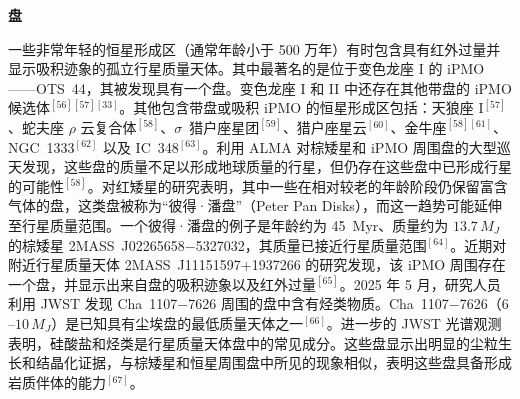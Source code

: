 \textbf{盘}

一些非常年轻的恒星形成区（通常年龄小于 500 万年）有时包含具有红外过量并显示吸积迹象的孤立行星质量天体。其中最著名的是位于变色龙座 I 的 iPMO——OTS~44，其被发现具有一个盘。变色龙座 I 和 II 中还存在其他带盘的 iPMO 候选体$^{[56][57][33]}$。其他包含带盘或吸积 iPMO 的恒星形成区包括：天狼座 I$^{[57]}$、蛇夫座 $\rho$ 云复合体$^{[58]}$、$\sigma$~猎户座星团$^{[59]}$、猎户座星云$^{[60]}$、金牛座$^{[58][61]}$、NGC~1333$^{[62]}$ 以及 IC~348$^{[63]}$。利用 ALMA 对棕矮星和 iPMO 周围盘的大型巡天发现，这些盘的质量不足以形成地球质量的行星，但仍存在这些盘中已形成行星的可能性$^{[58]}$。对红矮星的研究表明，其中一些在相对较老的年龄阶段仍保留富含气体的盘，这类盘被称为“彼得·潘盘”（Peter Pan Disks），而这一趋势可能延伸至行星质量范围。一个彼得·潘盘的例子是年龄约为 45~Myr、质量约为 $13.7\,M_J$ 的棕矮星 2MASS~J02265658$-$5327032，其质量已接近行星质量范围$^{[64]}$。近期对附近行星质量天体 2MASS~J11151597+1937266 的研究发现，该 iPMO 周围存在一个盘，并显示出来自盘的吸积迹象以及红外过量$^{[65]}$。2025 年 5 月，研究人员利用 JWST 发现 Cha~1107$-$7626 周围的盘中含有烃类物质。Cha~1107$-$7626（$6$--$10\,M_J$）是已知具有尘埃盘的最低质量天体之一$^{[66]}$。进一步的 JWST 光谱观测表明，硅酸盐和烃类是行星质量天体盘中的常见成分。这些盘显示出明显的尘粒生长和结晶化证据，与棕矮星和恒星周围盘中所见的现象相似，表明这些盘具备形成岩质伴体的能力$^{[67]}$。
